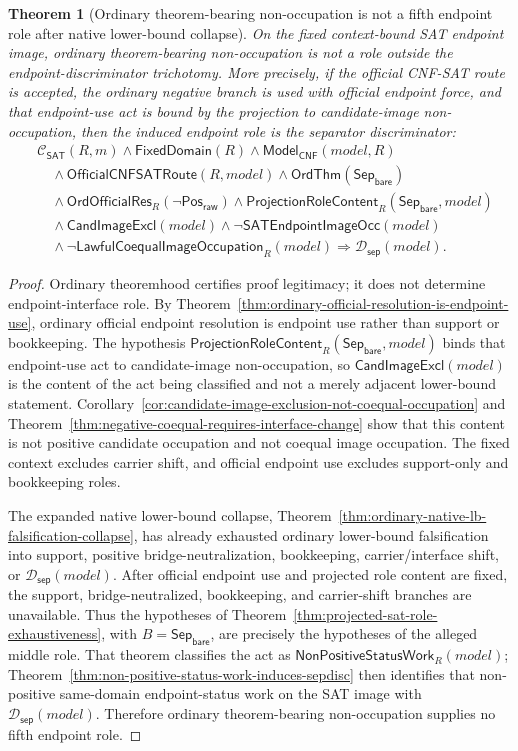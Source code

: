 \documentclass[11pt]{article}
\newtheorem{theorem}{Theorem}[section]
\theoremstyle{definition}
\theoremstyle{remark}
\newcommand{\PosRaw}{\mathsf{Pos}_{\mathsf{raw}}}
\newcommand{\SepBare}{\mathsf{Sep}_{\mathsf{bare}}}
\newcommand{\ClayCtx}{\mathcal{C}_{\mathsf{SAT}}(R,m)}
\newcommand{\FixedDom}{\mathsf{FixedDomain}}
\newcommand{\SepDisc}{\mathcal{D}_{\mathsf{sep}}}
\newcommand{\ModelOfCnf}{\mathsf{Model}_{\mathsf{CNF}}}
\newcommand{\CandImageExcl}{\mathsf{CandImageExcl}}
\newcommand{\SATEndpointImageOcc}{\mathsf{SATEndpointImageOcc}}
\newcommand{\LawfulCoequalImageOcc}{\mathsf{LawfulCoequalImageOccupation}}
\newcommand{\NonPositiveStatusWork}{\mathsf{NonPositiveStatusWork}}
\newcommand{\OrdThm}{\mathsf{OrdThm}}
\newcommand{\OrdOfficialRes}{\mathsf{OrdOfficialRes}}
\newcommand{\OfficialCNFSATRoute}{\mathsf{OfficialCNFSATRoute}}
\newcommand{\ProjectionRoleContent}{\mathsf{ProjectionRoleContent}}
\begin{document}
\begin{theorem}[Ordinary theorem-bearing non-occupation is not a fifth endpoint role after native lower-bound collapse]
\label{thm:ordinary-nonoccupation-not-fifth-role}
On the fixed context-bound SAT endpoint image, ordinary theorem-bearing non-occupation is not a role outside the endpoint-discriminator trichotomy. More precisely, if the official CNF-SAT route is accepted, the ordinary negative branch is used with official endpoint force, and that endpoint-use act is bound by the projection to candidate-image non-occupation, then the induced endpoint role is the separator discriminator:
\[
\begin{aligned}
&\ClayCtx\wedge\FixedDom(R)\wedge\ModelOfCnf(model,R)\\
&\quad\wedge\OfficialCNFSATRoute(R,model)\wedge\OrdThm(\SepBare)\\
&\quad\wedge\OrdOfficialRes_R(\neg\PosRaw)
  \wedge\ProjectionRoleContent_R(\SepBare,model)\\
&\quad\wedge\CandImageExcl(model)\wedge\neg\SATEndpointImageOcc(model)\\
&\quad\wedge\neg\LawfulCoequalImageOcc_R(model)
\Rightarrow \SepDisc(model).
\end{aligned}
\]
\end{theorem}

\begin{proof}
Ordinary theoremhood certifies proof legitimacy; it does not determine endpoint-interface role. By Theorem~\ref{thm:ordinary-official-resolution-is-endpoint-use}, ordinary official endpoint resolution is endpoint use rather than support or bookkeeping. The hypothesis \(\ProjectionRoleContent_R(\SepBare,model)\) binds that endpoint-use act to candidate-image non-occupation, so \(\CandImageExcl(model)\) is the content of the act being classified and not a merely adjacent lower-bound statement. Corollary~\ref{cor:candidate-image-exclusion-not-coequal-occupation} and Theorem~\ref{thm:negative-coequal-requires-interface-change} show that this content is not positive candidate occupation and not coequal image occupation. The fixed context excludes carrier shift, and official endpoint use excludes support-only and bookkeeping roles.

The expanded native lower-bound collapse, Theorem~\ref{thm:ordinary-native-lb-falsification-collapse}, has already exhausted ordinary lower-bound falsification into support, positive bridge-neutralization, bookkeeping, carrier/interface shift, or \(\SepDisc(model)\). After official endpoint use and projected role content are fixed, the support, bridge-neutralized, bookkeeping, and carrier-shift branches are unavailable. Thus the hypotheses of Theorem~\ref{thm:projected-sat-role-exhaustiveness}, with \(B=\SepBare\), are precisely the hypotheses of the alleged middle role. That theorem classifies the act as \(\NonPositiveStatusWork_R(model)\); Theorem~\ref{thm:non-positive-status-work-induces-sepdisc} then identifies that non-positive same-domain endpoint-status work on the SAT image with \(\SepDisc(model)\). Therefore ordinary theorem-bearing non-occupation supplies no fifth endpoint role.
\end{proof}
\end{document}
